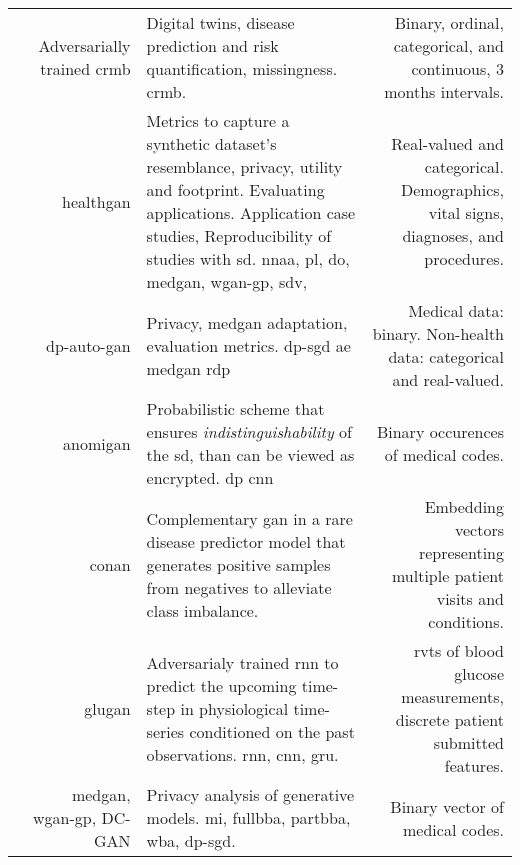 \begin{center}
\begin{longtable}[l]{@{}p{}NMR@{}}
        \hline
         & & & \\
        \hline
        
        \citeauthor{walsh2020generating} & Adversarially trained \gls{crmb}
        & Digital twins, disease prediction and risk quantification, missingness.   \gls{crmb}.
        & Binary, ordinal, categorical, and continuous, 3 months intervals.\\
        
        \citeauthor{Yale_2020} & \gls{healthgan}
        & Metrics to capture a synthetic dataset’s resemblance, privacy, utility and footprint. Evaluating applications. Application case studies, Reproducibility of studies with \gls{sd}.  \gls{nnaa}, \gls{pl}, \gls{do}, \gls{medgan}, \gls{wgan-gp}, \gls{sdv}, 
        & Real-valued and categorical. Demographics, vital signs, diagnoses, and procedures.\\
        
        \citeauthor{tanti2019} & \gls{dp-auto-gan}
        & Privacy, \gls{medgan} adaptation, evaluation metrics.  \gls{dp-sgd} \gls{ae} \gls{medgan} \gls{rdp}
        & Medical data: binary. Non-health data: categorical and real-valued.\\
        
        \citeauthor{BaeAnomiGAN2020} & \gls{anomigan}
        & Probabilistic scheme that ensures \textit{indistinguishability} of the \gls{sd}, than can be viewed as encrypted.  \gls{dp} \gls{cnn}
        & Binary occurences of medical codes.\\
        
        \citeauthor{cui2019conan} & \gls{conan}
        & Complementary \gls{gan} in a rare disease predictor model that generates positive samples from negatives to alleviate class imbalance.
        & Embedding vectors representing multiple patient visits and conditions.\\
        
        \citeauthor{zhu_2020} & \gls{glugan}
        & Adversarialy trained \gls{rnn} to predict the upcoming time-step in physiological time-series conditioned on the past observations.  \gls{rnn}, \gls{cnn}, \gls{gru}.
        & \Gls{rvts} of blood glucose measurements, discrete patient submitted features.\\
        
        \citeauthor{chen2019ganleaks} & \gls{medgan}, \gls{wgan-gp}, DC-GAN
        & Privacy analysis of generative models.   \gls{mi}, \gls{fullbba}, \gls{partbba}, \gls{wba}, \gls{dp-sgd}.
        & Binary vector of medical codes.\\
        

\end{longtable}
\end{center}
